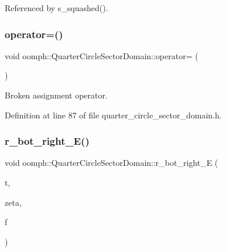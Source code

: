 Referenced by s\+\_\+squashed().

\mbox{\label{classoomph_1_1QuarterCircleSectorDomain_a13bb4a1ac04f99ded56c398474676ce1}} 
\subsubsection{\texorpdfstring{operator=()}{operator=()}}
{\footnotesize\ttfamily void oomph\+::\+Quarter\+Circle\+Sector\+Domain\+::operator= (\begin{DoxyParamCaption}\item[{const \hyperlink{classoomph_1_1QuarterCircleSectorDomain}{Quarter\+Circle\+Sector\+Domain} \&}]{ }\end{DoxyParamCaption})\hspace{0.3cm}{\ttfamily [inline]}}



Broken assignment operator. 



Definition at line 87 of file quarter\+\_\+circle\+\_\+sector\+\_\+domain.\+h.

\mbox{\label{classoomph_1_1QuarterCircleSectorDomain_abb05f2e719d81f167fc0f608e80c5696}} 
\subsubsection{\texorpdfstring{r\+\_\+bot\+\_\+right\+\_\+\+E()}{r\_bot\_right\_E()}}
{\footnotesize\ttfamily void oomph\+::\+Quarter\+Circle\+Sector\+Domain\+::r\+\_\+bot\+\_\+right\+\_\+E (\begin{DoxyParamCaption}\item[{const unsigned \&}]{t,  }\item[{const Vector$<$ double $>$ \&}]{zeta,  }\item[{Vector$<$ double $>$ \&}]{f }\end{DoxyParamCaption})\hspace{0.3cm}{\ttfamily [private]}}



